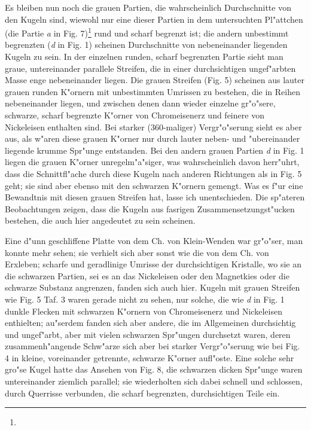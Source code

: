 \documentclass[a4paper, 11pt, oneside]{article}
\begin{document}
Es bleiben nun noch die grauen Partien, die wahrscheinlich Durchschnitte von den Kugeln sind, wiewohl nur eine dieser Partien in dem untersuchten Pl"attchen (die Partie \emph{a} in Fig. 7)\footnote{} rund und scharf begrenzt ist; die andern unbestimmt begrenzten (\emph{d} in Fig. 1) scheinen Durchschnitte von nebeneinander liegenden Kugeln zu sein. In der einzelnen runden, scharf begrenzten Partie sieht man graue, untereinander parallele Streifen, die in einer durchsichtigen ungef"arbten Masse enge nebeneinander liegen. Die grauen Streifen (Fig. 5) scheinen aus lauter grauen runden K"ornern mit unbestimmten Umrissen zu bestehen, die in Reihen nebeneinander liegen, und zwischen denen dann wieder einzelne gr"o"sere, schwarze, scharf begrenzte K"orner von Chromeisenerz und feinere von Nickeleisen enthalten sind. Bei starker (360-maliger) Vergr"o"serung sieht es aber aus, als w"aren diese grauen K"orner nur durch lauter neben- und "ubereinander liegende krumme Spr"unge entstanden. Bei den andern grauen Partien \emph{d} in Fig. 1 liegen die grauen K"orner unregelm"a"siger, was wahrscheinlich davon herr"uhrt, dass die Schnittfl"ache durch diese Kugeln nach anderen Richtungen als in Fig. 5 geht; sie sind aber ebenso mit den schwarzen K"ornern gemengt. Was es f"ur eine Bewandtnis mit diesen grauen Streifen hat, lasse ich unentschieden. Die sp"ateren Beobachtungen zeigen, dass die Kugeln aus fasrigen Zusammensetzungst"ucken bestehen, die auch hier angedeutet zu sein scheinen.

Eine d"unn geschliffene Platte von dem Ch. von Klein-Wenden war gr"o"ser, man konnte mehr sehen; sie verhielt sich aber sonst wie die von dem Ch. von Erxleben; scharfe und geradlinige Umrisse der durchsichtigen Kristalle, wo sie an die schwarzen Partien, sei es an das Nickeleisen oder den Magnetkies oder die schwarze Substanz angrenzen, fanden sich auch hier. Kugeln mit grauen Streifen wie Fig. 5 Taf. 3 waren gerade nicht zu sehen, nur solche, die wie \emph{d} in Fig. 1 dunkle Flecken mit schwarzen K"ornern von Chromeisenerz und Nickeleisen enthielten; au"serdem fanden sich aber andere, die im Allgemeinen durchsichtig und ungef"arbt, aber mit vielen schwarzen Spr"ungen durchsetzt waren, deren zusammenh"angende Schw"arze sich aber bei starker Vergr"o"serung wie bei Fig. 4 in kleine, voreinander getrennte, schwarze K"orner aufl"oste. Eine solche sehr gro"se Kugel hatte das Ansehen von Fig. 8, die schwarzen dicken Spr"unge waren untereinander ziemlich parallel; sie wiederholten sich dabei schnell und schlossen, durch Querrisse verbunden, die scharf begrenzten, durchsichtigen Teile ein.
\end{document}
